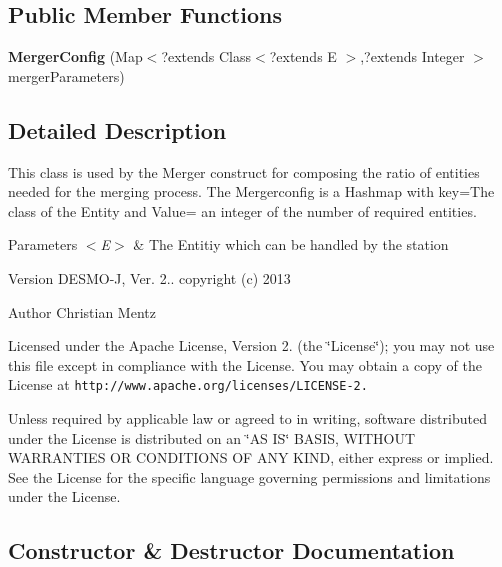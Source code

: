 \subsection*{Public Member Functions}
\begin{DoxyCompactItemize}
\item 
{\bf Merger\-Config} (Map$<$?extends Class$<$?extends E $>$,?extends Integer $>$ merger\-Parameters)
\end{DoxyCompactItemize}


\subsection{Detailed Description}
This class is used by the Merger construct for composing the ratio of entities needed for the merging process. The Mergerconfig is a Hashmap with key=The class of the Entity and Value= an integer of the number of required entities.


\begin{DoxyParams}{Parameters}
{\em $<$\-E$>$} & The Entitiy which can be handled by the station\\
\hline
\end{DoxyParams}
\begin{DoxyVersion}{Version}
D\-E\-S\-M\-O-\/\-J, Ver. 2.. copyright (c) 2013 
\end{DoxyVersion}
\begin{DoxyAuthor}{Author}
Christian Mentz
\end{DoxyAuthor}
Licensed under the Apache License, Version 2. (the \char`\"{}\-License\char`\"{}); you may not use this file except in compliance with the License. You may obtain a copy of the License at {\tt http\-://www.\-apache.\-org/licenses/\-L\-I\-C\-E\-N\-S\-E-\/2.}

Unless required by applicable law or agreed to in writing, software distributed under the License is distributed on an \char`\"{}\-A\-S I\-S\char`\"{} B\-A\-S\-I\-S, W\-I\-T\-H\-O\-U\-T W\-A\-R\-R\-A\-N\-T\-I\-E\-S O\-R C\-O\-N\-D\-I\-T\-I\-O\-N\-S O\-F A\-N\-Y K\-I\-N\-D, either express or implied. See the License for the specific language governing permissions and limitations under the License. 

\subsection{Constructor \& Destructor Documentation}
